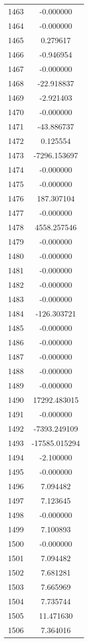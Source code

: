 \documentclass[12pt]{article}
\begin{document}
\begin{longtable}{@{}cc@{}}
1463 & -0.000000 \\
1464 & -0.000000 \\
1465 & 0.279617 \\
1466 & -0.946954 \\
1467 & -0.000000 \\
1468 & -22.918837 \\
1469 & -2.921403 \\
1470 & -0.000000 \\
1471 & -43.886737 \\
1472 & 0.125554 \\
1473 & -7296.153697 \\
1474 & -0.000000 \\
1475 & -0.000000 \\
1476 & 187.307104 \\
1477 & -0.000000 \\
1478 & 4558.257546 \\
1479 & -0.000000 \\
1480 & -0.000000 \\
1481 & -0.000000 \\
1482 & -0.000000 \\
1483 & -0.000000 \\
1484 & -126.303721 \\
1485 & -0.000000 \\
1486 & -0.000000 \\
1487 & -0.000000 \\
1488 & -0.000000 \\
1489 & -0.000000 \\
1490 & 17292.483015 \\
1491 & -0.000000 \\
1492 & -7393.249109 \\
1493 & -17585.015294 \\
1494 & -2.100000 \\
1495 & -0.000000 \\
1496 & 7.094482 \\
1497 & 7.123645 \\
1498 & -0.000000 \\
1499 & 7.100893 \\
1500 & -0.000000 \\
1501 & 7.094482 \\
1502 & 7.681281 \\
1503 & 7.665969 \\
1504 & 7.735744 \\
1505 & 11.471630 \\
1506 & 7.364016 \\

\end{longtable}
\end{document}
